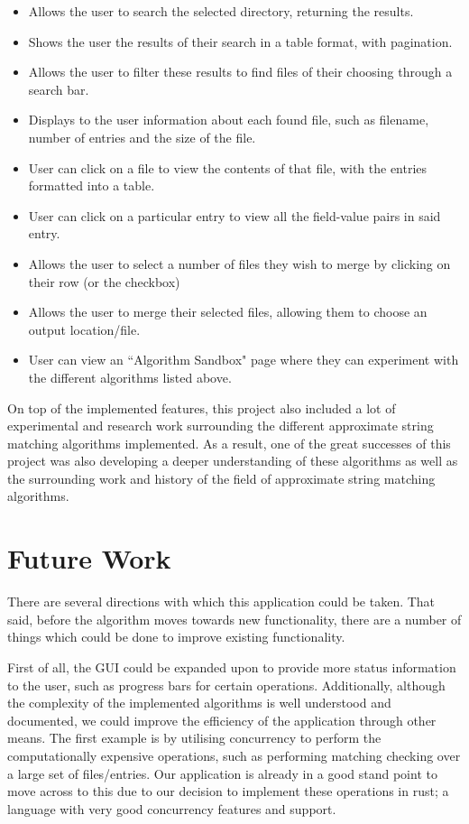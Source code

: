 \documentclass[a4paper,11pt]{article}
\begin{document}
\begin{itemize}
\begin{itemize}
        \item Allows the user to search the selected directory, returning the results.
        \item Shows the user the results of their search in a table format, with pagination.
        \item Allows the user to filter these results to find files of their choosing through a search bar.
        \item Displays to the user information about each found file, such as filename, number of entries and the size of the file.
        \item User can click on a file to view the contents of that file, with the entries formatted into a table.
        \item User can click on a particular entry to view all the field-value pairs in said entry.
        \item Allows the user to select a number of files they wish to merge by clicking on their row (or the checkbox)
        \item Allows the user to merge their selected files, allowing them to choose an output location/file.
        \item User can view an ``Algorithm Sandbox" page where they can experiment with the different algorithms listed above.
    \end{itemize}
\end{itemize}

On top of the implemented features, this project also included a lot of experimental and research work surrounding the different approximate string matching algorithms implemented. As a result, one of the great successes of this project was also developing a deeper understanding of these algorithms as well as the surrounding work and history of the field of approximate string matching algorithms.

\section{Future Work}
There are several directions with which this application could be taken. That said, before the algorithm moves towards new functionality, there are a number of things which could be done to improve existing functionality.

First of all, the GUI could be expanded upon to provide more status information to the user, such as progress bars for certain operations. Additionally, although the complexity of the implemented algorithms is well understood and documented, we could improve the efficiency of the application through other means. The first example is by utilising concurrency to perform the computationally expensive operations, such as performing matching checking over a large set of files/entries. Our application is already in a good stand point to move across to this due to our decision to implement these operations in rust; a language with very good concurrency features and support.
\end{document}
